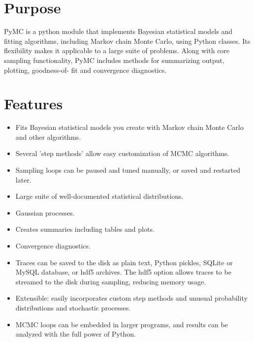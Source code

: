 





\hypertarget{purpose}{}
\section*{Purpose}
\label{purpose}

PyMC is a python module that implements Bayesian statistical models and
fitting algorithms, including Markov chain Monte Carlo, using Python classes.
Its flexibility makes it applicable to a large suite of problems. Along with
core sampling functionality, PyMC includes methods for summarizing output, plotting,
goodness-of- fit and convergence diagnostics.



\hypertarget{features}{}
\section*{Features}
\label{features}
\begin{itemize}
\item {} 
Fits Bayesian statistical models you create with Markov chain Monte Carlo and
other algorithms.

\item {} 
Several 'step methods' allow easy customization of MCMC algorithms.

\item {} 
Sampling loops can be paused and tuned manually, or saved and restarted later.

\item {} 
Large suite of well-documented statistical distributions.

\item {} 
Gaussian processes.

\item {} 
Creates summaries including tables and plots.

\item {} 
Convergence diagnostics.

\item {} 
Traces can be saved to the disk as plain text, Python pickles, SQLite or MySQL
database, or hdf5 archives. The hdf5 option allows traces to be streamed
to the disk during sampling, reducing memory usage.

\item {} 
Extensible: easily incorporates custom step methods and unusual probability
distributions and stochastic processes.

\item {} 
MCMC loops can be embedded in larger programs, and results can be analyzed
with the full power of Python.

\end{itemize}


